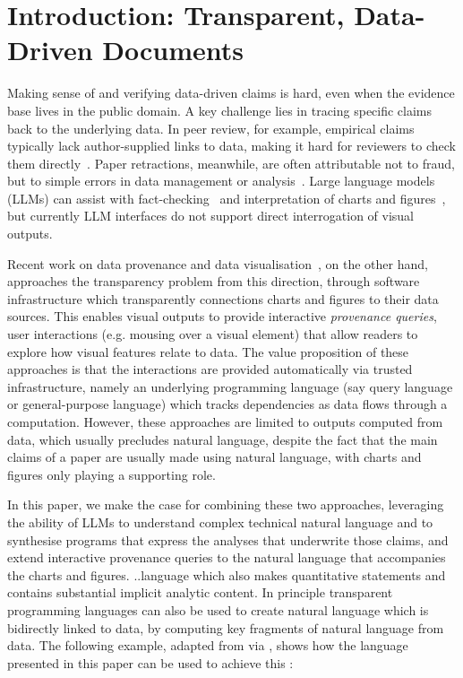 \section{Introduction: Transparent, Data-Driven Documents}

Making sense of and verifying data-driven claims is hard, even when the evidence base lives in the public
domain. A key challenge lies in tracing specific claims back to the underlying data. In peer review, for
example, empirical claims typically lack author-supplied links to data, making it hard for reviewers to check
them directly~\citep{weber20}. Paper retractions, meanwhile, are often attributable not to fraud, but to
simple errors in data management or analysis~\citep{hu25}. Large language models (LLMs) can assist with
fact-checking~\citep{abu-ahmad25} and interpretation of charts and figures~\citep{roberts24}, but currently
LLM interfaces do not support direct interrogation of visual outputs.

Recent work on data provenance and data visualisation~\citep{psallidas18smoke,perera22,bond25}, on the other
hand, approaches the transparency problem from this direction, through software infrastructure which
transparently connections charts and figures to their data sources.  This enables visual outputs to provide interactive \emph{provenance queries}, user
interactions (e.g. mousing over a visual element) that allow readers to explore how visual features relate to
data. The value proposition of these approaches is that the interactions are provided automatically via
trusted infrastructure, namely an underlying programming language (say query language or general-purpose
language) which tracks dependencies as data flows through a computation. However, these approaches are limited
to outputs computed from data, which usually precludes natural language, despite the fact that the main claims
of a paper are usually made using natural language, with charts and figures only playing a supporting role.

In this paper, we make the case for combining these two approaches, leveraging the ability of LLMs to
understand complex technical natural language and to synthesise programs that express the analyses that
underwrite those claims, and extend interactive provenance queries to the natural language that accompanies
the charts and figures.  ..language which also makes quantitative statements and contains substantial implicit
analytic content. In principle transparent programming languages can also be used to create natural language
which is bidirectly linked to data, by computing key fragments of natural language from data. The following
example, adapted from \cite{zhang18} via \cite{moosavi21}, shows how the language presented in this paper can
be used to achieve this :

